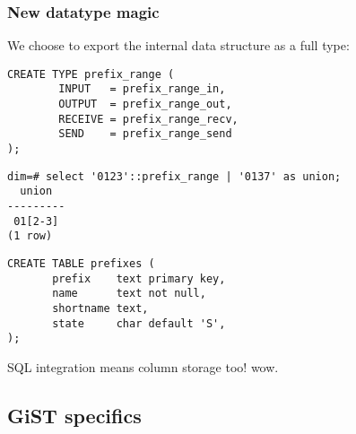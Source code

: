\documentclass{beamer}
\begin{document}
\begin{frame}[fragile]
  \frametitle{New datatype magic}

  We choose to export the internal data structure as a full type:

  \begin{example}
  \begin{overprint}

  \begin{verbatim}
CREATE TYPE prefix_range (
        INPUT   = prefix_range_in,
        OUTPUT  = prefix_range_out,
        RECEIVE = prefix_range_recv,
        SEND    = prefix_range_send
);
  \end{verbatim}

  \begin{verbatim}
dim=# select '0123'::prefix_range | '0137' as union;
  union
---------
 01[2-3]
(1 row)
  \end{verbatim}

  \begin{verbatim}
CREATE TABLE prefixes (
       prefix    text primary key,
       name      text not null,
       shortname text,
       state     char default 'S',
);
  \end{verbatim}

  \end{overprint}
  \end{example}
  
   SQL integration means column storage too! \alert{wow}.
\end{frame}

\subsection{GiST specifics}
\end{document}
